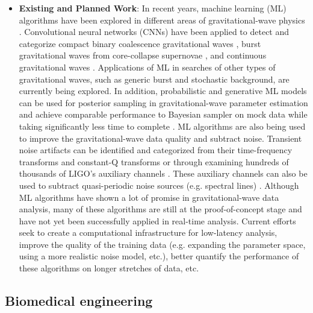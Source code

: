 \begin{itemize}
        \item \textbf{Existing and Planned Work}:
        In recent years, machine learning (ML) algorithms have been explored in different areas of gravitational-wave physics \cite{Cuoco_2020}.
        Convolutional neural networks (CNNs) have been applied to detect and categorize compact binary coalescence gravitational waves \cite{PhysRevLett.120.141103, Kim_2015, PhysRevD.101.083006, George_2018, Gebhard_2019}, burst gravitational waves from core-collapse supernovae \cite{Astone_2018, Chan_2020, Iess_2020}, and continuous gravitational waves \cite{Dreissigacker_2019, Beheshtipour_2020}.
        Applications of ML in searches of other types of gravitational waves, such as generic burst and stochastic background, are currently being explored.
        In addition, probabilistic and generative ML models can be used for posterior sampling in gravitational-wave parameter estimation and achieve comparable performance to Bayesian sampler on mock data while taking significantly less time to complete \cite{shen2019deterministic, gabbard2020bayesian,  PhysRevLett.124.041102}.
        ML algorithms are also being used to improve the gravitational-wave data quality and subtract noise.
        Transient noise artifacts can be identified and categorized from their time-frequency transforms and constant-Q transforms \cite{Zevin_2017, Razzano_2018} or through examining hundreds of thousands of LIGO's auxiliary channels \cite{iDQ2013}.
        These auxiliary channels can also be used to subtract quasi-periodic noise sources (e.g. spectral lines) \cite{PhysRevD.101.042003, Ormiston_2020}.
        Although ML algorithms have shown a lot of promise in gravitational-wave data analysis, many of these algorithms are still at the proof-of-concept stage and have not yet been successfully applied in real-time analysis.
        Current efforts seek to create a computational infrastructure for low-latency analysis, improve the quality of the training data (e.g. expanding the parameter space, using a more realistic noise model, etc.), better quantify the performance of these algorithms on longer stretches of data, etc.
    \end{itemize}

\subsection{Biomedical engineering}

